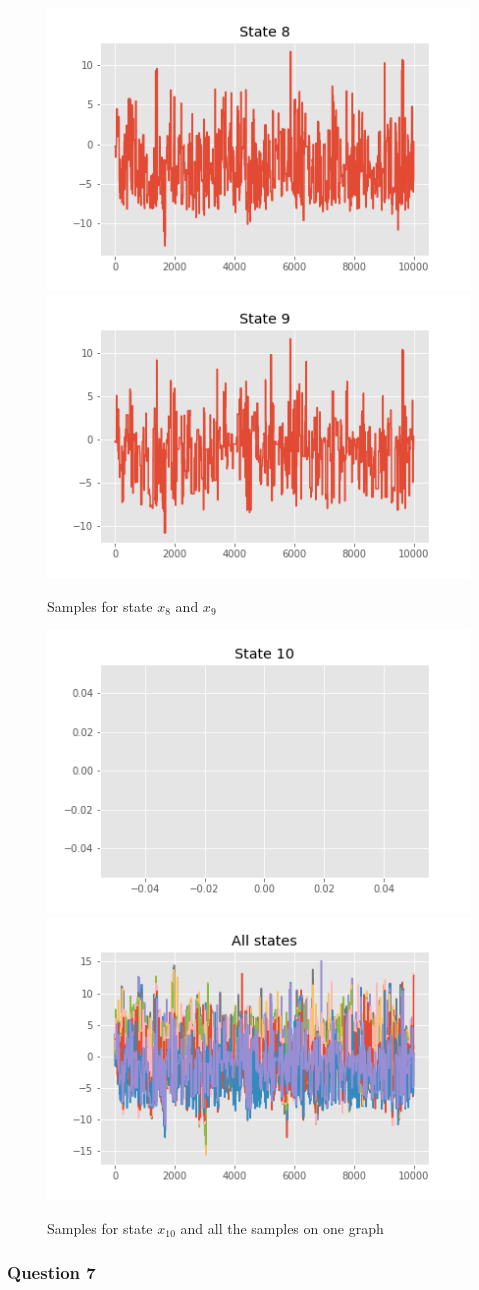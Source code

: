 \documentclass[]{article}
\begin{document}
	\begin{figure}[H]
		\begin{center}
			\includegraphics[width=.4\textwidth]{task2/figures/T_2_2/Q1/plt_x8.png}
			\includegraphics[width=.4\textwidth]{task2/figures/T_2_2/Q1/plt_x9.png}
			
			\caption*{Samples for state $x_8$ and $x_9$}
		\end{center}
	\end{figure}
	
	\begin{figure}[H]
		\begin{center}
			\includegraphics[width=.4\textwidth]{task2/figures/T_2_2/Q1/plt_x10.png}
			\includegraphics[width=.4\textwidth]{task2/figures/T_2_2/Q1/plt_x_all.png}
			
			\caption*{Samples for state $x_10$ and all the samples on one graph}
		\end{center}
	\end{figure}
	
	\subsubsection{Question 7}
	
\end{document}
